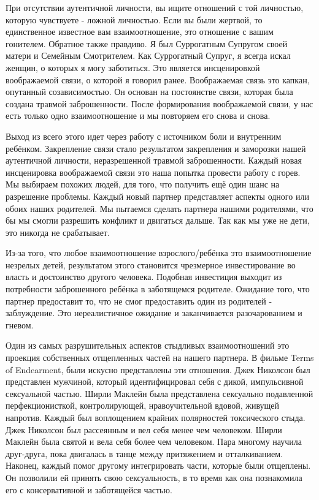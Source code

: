 \documentclass[10pt, fleqn]{article}
\begin{document}

При отсутствии аутентичной личности, вы ищите отношений с той личностью, которую чувствуете - ложной личностью. Если вы были жертвой, то единственное известное вам взаимоотношение, это отношение с вашим гонителем. Обратное также правдиво. Я был Суррогатным Супругом своей матери и Семейным Смотрителем. Как Суррогатный Супруг, я всегда искал женщин, о которых я могу заботиться. Это является инсценировкой воображаемой связи, о которой я говорил ранее. Воображаемая связь это капкан, опутанный созависимостью. Он основан на постоянстве связи, которая была создана травмой заброшенности. После формирования воображаемой связи, у нас есть только одно взаимоотношение и мы повторяем его снова и снова.

Выход из всего этого идет через работу с источником боли и внутренним ребёнком. Закрепление связи стало результатом закрепления и заморозки нашей аутентичной личности, неразрешенной травмой заброшенности. Каждый новая инсценировка воображаемой связи это наша попытка провести работу с горев. Мы выбираем похожих людей, для того, что получить ещё один шанс на разрешение проблемы. Каждый новый партнер представляет аспекты одного или обоих наших родителей. Мы пытаемся сделать партнера нашими родителями, что бы мы смогли разрешить конфликт и двигаться дальше. Так как мы уже не дети, это никогда не срабатывает.


Из-за того, что любое взаимоотношение взрослого/ребёнка это взаимоотношение незрелых детей, результатом этого становится чрезмерное инвестирование во власть и достоинство другого человека. Подобная инвестиция выходит из потребности заброшенного ребёнка в заботящемся родителе. Ожидание того, что партнер предоставит то, что не смог предоставить один из родителей - заблуждение. Это нереалистичное ожидание и заканчивается разочарованием и гневом.


Один из самых разрушительных аспектов стыдливых взаимоотношений это проекция собственных отщепленных частей на нашего партнера. В фильме Terms of Endearment, были искусно представлены эти отношения. Джек Николсон был представлен мужчиной, который идентифицировал себя с дикой, импульсивной сексуальной частью. Ширли Маклейн была представлена сексуально подавленной перфекционисткой, контролирующей, нравоучительной вдовой, живущей напротив. Каждый был воплощением крайних полярностей токсического стыда. Джек Николсон был рассеянным и вел себя менее чем человеком. Ширли Маклейн была святой и вела себя более чем человеком. Пара многому научила друг-друга, пока двигалась в танце между притяжением и отталкиванием. Наконец, каждый помог другому интегрировать части, которые были отщеплены. Он позволили ей принять свою сексуальность, в то время как она познакомила его с консервативной и заботящейся частью.
\end{document}
